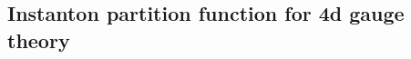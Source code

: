 \documentclass[letterpaper, 11pt]{article}
\def\CN{{\cal N}}
\def\a{\alpha}
\def\g{\gamma}
\def\e{\epsilon}
\begin{document}
\subsection{Instanton partition function for 4d gauge theory}
\end{document}
